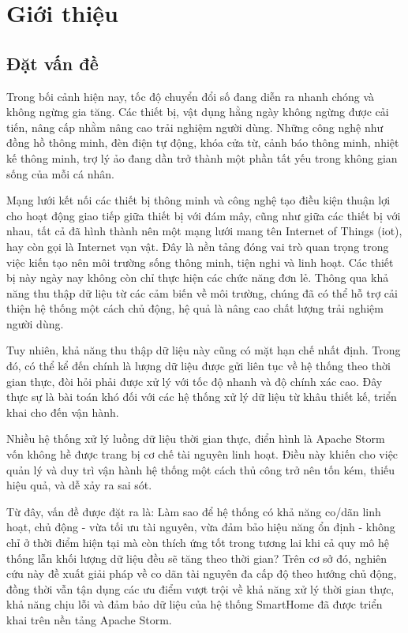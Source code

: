 \chapter{Giới thiệu}

\section{Đặt vấn đề}

Trong bối cảnh hiện nay, tốc độ chuyển đổi số đang diễn ra nhanh chóng và không ngừng gia tăng. Các thiết bị, vật dụng hằng ngày không ngừng được cải tiến, nâng cấp nhằm nâng cao trải nghiệm người dùng. Những công nghệ như đồng hồ thông minh, đèn điện tự động, khóa cửa từ, cảnh báo thông minh, nhiệt kế thông minh, trợ lý ảo đang dần trở thành một phần tất yếu trong không gian sống của mỗi cá nhân.

Mạng lưới kết nối các thiết bị thông minh và công nghệ tạo điều kiện thuận lợi cho hoạt động giao tiếp giữa thiết bị với đám mây, cũng như giữa các thiết bị với nhau, tất cả đã hình thành nên một mạng lưới mang tên Internet of Things (\gls{iot}), hay còn gọi là Internet vạn vật. Đây là nền tảng đóng vai trò quan trọng trong việc kiến tạo nên môi trường sống thông minh, tiện nghi và linh hoạt. Các thiết bị này ngày nay không còn chỉ thực hiện các chức năng đơn lẻ. Thông qua khả năng thu thập dữ liệu từ các cảm biến về môi trường, chúng đã có thể hỗ trợ cải thiện hệ thống một cách chủ động, hệ quả là nâng cao chất lượng trải nghiệm người dùng.


Tuy nhiên, khả năng thu thập dữ liệu này cũng có mặt hạn chế nhất định. Trong đó, có thể kể đến chính là lượng dữ liệu được gửi liên tục về hệ thống theo thời gian thực, đòi hỏi phải được xử lý với tốc độ nhanh và độ chính xác cao. Đây thực sự là bài toán khó đối với các hệ thống xử lý dữ liệu từ khâu thiết kế, triển khai cho đến vận hành.

Nhiều hệ thống xử lý luồng dữ liệu thời gian thực, điển hình là Apache Storm vốn không hề được trang bị cơ chế tài nguyên linh hoạt. Điều này khiến cho việc quản lý và duy trì vận hành hệ thống một cách thủ công trở nên tốn kém, thiếu hiệu quả, và dễ xảy ra sai sót.

Từ đây, vấn đề được đặt ra là: Làm sao để hệ thống có khả năng co/dãn linh hoạt, chủ động - vừa tối ưu tài nguyên, vừa đảm bảo hiệu năng ổn định - không chỉ ở thời điểm hiện tại mà còn thích ứng tốt trong tương lai khi cả quy mô hệ thống lẫn khối lượng dữ liệu đều sẽ tăng theo thời gian? Trên cơ sở đó, nghiên cứu này đề xuất giải pháp về co dãn tài nguyên đa cấp độ theo hướng chủ động, đồng thời vẫn tận dụng các ưu điểm vượt trội về khả năng xử lý thời gian thực, khả năng chịu lỗi và đảm bảo dữ liệu của hệ thống SmartHome đã được triển khai trên nền tảng Apache Storm.

